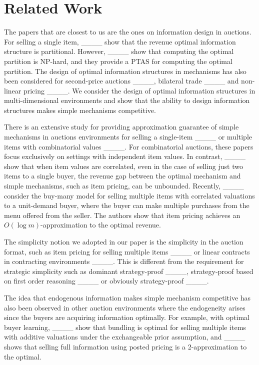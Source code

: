 \section{Related Work}
\label{sub:literature}
The papers that are closest to us are the ones on information design in auctions. 
For selling a single item, ____ show that the revenue optimal information structure is partitional. 
However, ____ show that computing the optimal partition is NP-hard, and they provide a PTAS for computing the optimal partition. 
The design of optimal information structures in mechanisms has also been considered for second-price auctions ____, bilateral trade ____
and non-linear pricing ____.
We consider the design of optimal information structures in multi-dimensional environments and show that the ability to design information structures makes simple mechanisms competitive. 

There is an extensive study for providing approximation guarantee of simple mechanisms in auctions environments for selling a single-item ____
or multiple items with combinatorial values ____. 
For combinatorial auctions, these papers focus exclusively on settings with independent item values. In contrast, ____ show that when item values are correlated, even in the case of selling just two items to a single buyer, the revenue gap between the optimal mechanism and simple mechanisms, such as item pricing, can be unbounded.
Recently, ____ consider the buy-many model for selling multiple items with correlated valuations to a unit-demand buyer, where the buyer can make multiple purchases from the menu offered from the seller. The authors show that item pricing achieves an $O(\log m)$-approximation to the optimal revenue. 

The simplicity notion we adopted in our paper is the simplicity in the auction format, such as item pricing for selling multiple items ____ or linear contracts in contracting environments ____.
This is different from the requirement for strategic simplicity such as dominant strategy-proof ____, strategy-proof based on first order reasoning ____ or obviously strategy-proof ____. 

The idea that endogenous information makes simple mechanism competitive has also been observed in other auction environments where the endogeneity arises since the buyers are acquiring information optimally. 
For example, with optimal buyer learning, ____ show that bundling is optimal for selling multiple items with additive valuations under the exchangeable prior assumption, 
and ____ shows that selling full information using posted pricing is a 2-approximation to the optimal.